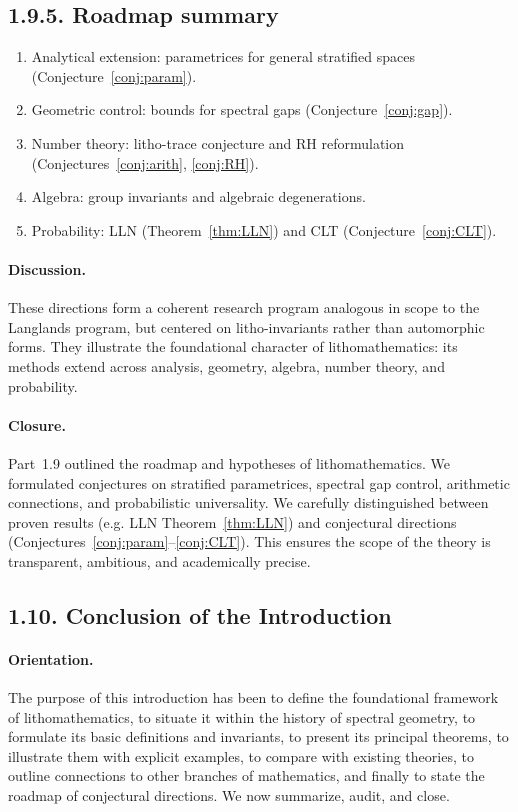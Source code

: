 \subsection*{1.9.5. Roadmap summary}

\begin{enumerate}
\item Analytical extension: parametrices for general stratified spaces (Conjecture~\ref{conj:param}).
\item Geometric control: bounds for spectral gaps (Conjecture~\ref{conj:gap}).
\item Number theory: litho-trace conjecture and RH reformulation (Conjectures~\ref{conj:arith}, \ref{conj:RH}).
\item Algebra: group invariants and algebraic degenerations.
\item Probability: LLN (Theorem~\ref{thm:LLN}) and CLT (Conjecture~\ref{conj:CLT}).
\end{enumerate}

\paragraph{Discussion.}
These directions form a coherent research program
analogous in scope to the Langlands program,
but centered on litho-invariants rather than automorphic forms.
They illustrate the foundational character of lithomathematics:
its methods extend across analysis, geometry, algebra,
number theory, and probability.

\paragraph{Closure.}
Part~1.9 outlined the roadmap and hypotheses of lithomathematics.
We formulated conjectures on stratified parametrices,
spectral gap control, arithmetic connections,
and probabilistic universality.
We carefully distinguished between proven results
(e.g. LLN Theorem~\ref{thm:LLN})
and conjectural directions (Conjectures~\ref{conj:param}–\ref{conj:CLT}).
This ensures the scope of the theory is transparent,
ambitious, and academically precise.

\subsection*{1.10. Conclusion of the Introduction}

\paragraph{Orientation.}
The purpose of this introduction has been to define the foundational framework
of lithomathematics, to situate it within the history of spectral geometry,
to formulate its basic definitions and invariants,
to present its principal theorems,
to illustrate them with explicit examples,
to compare with existing theories,
to outline connections to other branches of mathematics,
and finally to state the roadmap of conjectural directions.
We now summarize, audit, and close.

